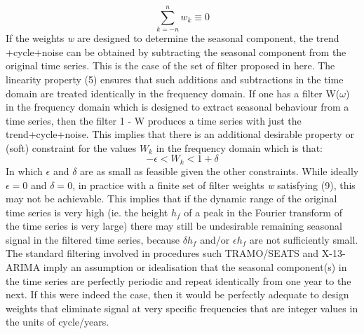 \documentclass{article}
\begin{document}
\begin{equation}
\sum \limits_{k=-n}^n w_k \equiv 0
\end{equation}
If the weights \textit{w} are designed to determine the seasonal component, the trend +cycle+noise can be obtained by subtracting the seasonal component from the original time series. This is the case of the set of filter proposed in here. The linearity property (5) ensures that such additions and subtractions in the time domain are treated identically in the frequency domain. If one has a filter W($\omega$) in the frequency domain which is designed to extract seasonal behaviour from a time series, then the filter 1 - W produces a time series with just the trend+cycle+noise. This implies that there is an additional desirable property or (soft) constraint for the values $W_k$ in the frequency domain which is that:
\begin{equation}
-\epsilon < W_k < 1+\delta
\end{equation}
In which $\epsilon$ and $\delta$ are as small as feasible given the other constraints. While ideally $\epsilon=0$ and $\delta=0$, in practice with a finite set of filter weights \textit{w} satisfying (9), this may not be achievable. This implies that if the dynamic range of the original time series is very high (ie. the height $h_f$ of a peak in the Fourier transform of the time series is very large) there may still be undesirable remaining seasonal signal in the filtered time series, because $\delta h_f$ and/or $\epsilon h_f$ are not sufficiently small.\\The standard filtering involved in procedures such TRAMO/SEATS and X-13-ARIMA imply an assumption or idealisation that the seasonal component(s) in the time series are perfectly periodic and repeat identically from one year to the next. If this were indeed the case, then it would be perfectly adequate to design weights that eliminate signal at very specific frequencies that are integer values in the units of cycle/years. %
\end{document}
